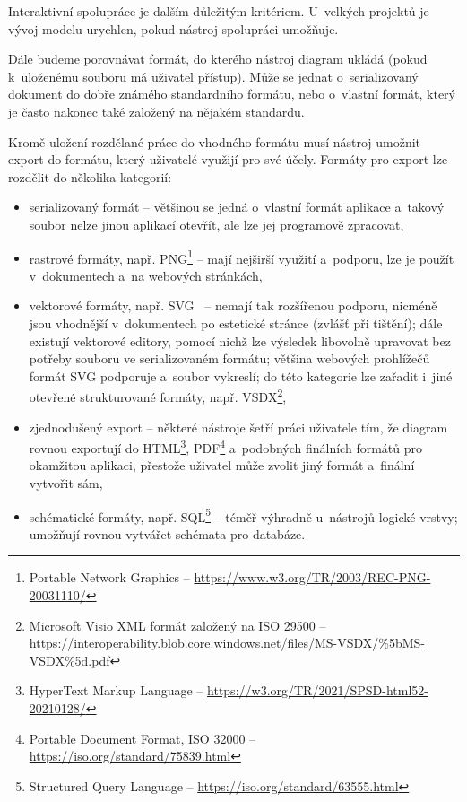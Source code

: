Interaktivní spolupráce je dalším důležitým kritériem.
U~velkých projektů je vývoj modelu urychlen, pokud nástroj spolupráci umožňuje.

Dále budeme porovnávat formát, do kterého nástroj diagram ukládá (pokud k~uloženému souboru má uživatel přístup).
Může se jednat o~serializovaný dokument do dobře známého standardního formátu, nebo o~vlastní formát, který je často nakonec také založený na nějakém standardu.

Kromě uložení rozdělané práce do vhodného formátu musí nástroj umožnit export do formátu, který uživatelé využijí pro své účely.
Formáty pro export lze rozdělit do několika kategorií:
\begin{itemize}
  \item serializovaný formát -- většinou se jedná o~vlastní formát aplikace a~takový soubor nelze jinou aplikací otevřít, ale lze jej programově zpracovat,
  \item rastrové formáty, např. PNG\footnote{Portable Network Graphics -- \url{https://www.w3.org/TR/2003/REC-PNG-20031110/}} -- mají nejširší využití a~podporu, lze je použít v~dokumentech a~na webových stránkách,
  \item vektorové formáty, např. SVG~\cite{Dirk18} -- nemají tak rozšířenou podporu, nicméně jsou vhodnější v~dokumentech po estetické stránce (zvlášť při tištění);
  dále existují vektorové editory, pomocí nichž lze výsledek libovolně upravovat bez potřeby souboru ve serializovaném formátu;
  většina webových prohlížečů formát SVG podporuje a~soubor vykreslí;
  do této kategorie lze zařadit i~jiné otevřené strukturované formáty, např. VSDX\footnote{Microsoft Visio XML formát založený na ISO 29500 -- \url{https://interoperability.blob.core.windows.net/files/MS-VSDX/\%5bMS-VSDX\%5d.pdf}},
  \item zjednodušený export -- některé nástroje šetří práci uživatele tím, že diagram rovnou exportují do HTML\footnote{HyperText Markup Language -- \url{https://w3.org/TR/2021/SPSD-html52-20210128/}}, PDF\footnote{Portable Document Format, ISO 32000 -- \url{https://iso.org/standard/75839.html}} a~podobných finálních formátů pro okamžitou aplikaci, přestože uživatel může zvolit jiný formát a~finální vytvořit sám,
  \item schématické formáty, např. SQL\footnote{Structured Query Language -- \url{https://iso.org/standard/63555.html}} -- téměř výhradně u~nástrojů lo\-gic\-ké vrst\-vy; umožňují rovnou vytvářet schémata pro databáze.
\end{itemize}

